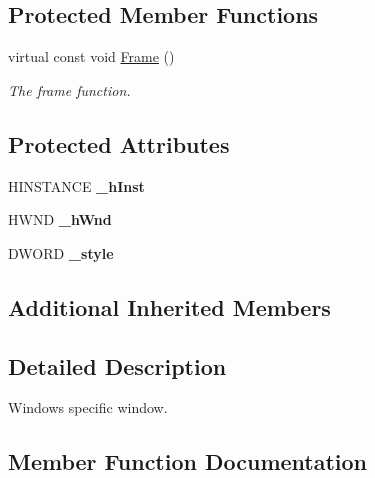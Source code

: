 \subsection*{Protected Member Functions}
\begin{DoxyCompactItemize}
\item 
virtual const void \hyperlink{class_ensum_1_1_core_1_1_win_window_a3e828ccbc90f0d6ed81c2320277561e6}{Frame} ()
\begin{DoxyCompactList}\small\item\em The frame function. \end{DoxyCompactList}\end{DoxyCompactItemize}
\subsection*{Protected Attributes}
\begin{DoxyCompactItemize}
\item 
H\+I\+N\+S\+T\+A\+N\+CE {\bfseries \+\_\+h\+Inst}\hypertarget{class_ensum_1_1_core_1_1_win_window_a19562456a0e7d38dc67b673ad8c0a9ea}{}\label{class_ensum_1_1_core_1_1_win_window_a19562456a0e7d38dc67b673ad8c0a9ea}

\item 
H\+W\+ND {\bfseries \+\_\+h\+Wnd}\hypertarget{class_ensum_1_1_core_1_1_win_window_af0bdb075823585bf3f99895ab4dcfffa}{}\label{class_ensum_1_1_core_1_1_win_window_af0bdb075823585bf3f99895ab4dcfffa}

\item 
D\+W\+O\+RD {\bfseries \+\_\+style}\hypertarget{class_ensum_1_1_core_1_1_win_window_af2bbdea21686b0d5a38bd3c85bc8f7db}{}\label{class_ensum_1_1_core_1_1_win_window_af2bbdea21686b0d5a38bd3c85bc8f7db}

\end{DoxyCompactItemize}
\subsection*{Additional Inherited Members}


\subsection{Detailed Description}
Windows specific window. 

\subsection{Member Function Documentation}
